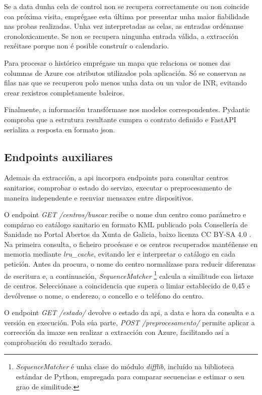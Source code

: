 Se a data dunha cela de control non se recupera correctamente ou non coincide coa próxima visita, emprégase esta última por presentar unha maior fiabilidade nas probas realizadas. Unha vez interpretadas as celas, as entradas ordénanse cronoloxicamente. Se non se recupera ningunha entrada válida, a extracción rexéitase porque non é posible construír o calendario.

Para procesar o histórico emprégase un mapa que relaciona os nomes das columnas de Azure cos atributos utilizados pola aplicación. Só se conservan as filas nas que se recuperou polo menos unha data ou un valor de INR, evitando crear rexistros completamente baleiros.

Finalmente, a información transfórmase nos modelos correspondentes. Pydantic comproba que a estrutura resultante cumpra o contrato definido e FastAPI serializa a resposta en formato \gls{json}.

\subsection{Endpoints auxiliares}

Ademais da extracción, a \gls{api} incorpora endpoints para consultar centros sanitarios, comprobar o estado do servizo, executar o preprocesamento de maneira independente e reenviar mensaxes entre dispositivos.

O endpoint \textit{GET /centros/buscar} recibe o nome dun centro como parámetro e compárao co catálogo sanitario en formato KML publicado pola Consellería de Sanidade no Portal Abertos da Xunta de Galicia, baixo licenza CC BY-SA 4.0 \cite{XuntaMapaServizosSanitarios}. Na primeira consulta, o ficheiro procésase e os centros recuperados mantéñense en memoria mediante \textit{lru\_cache}, evitando ler e interpretar o catálogo en cada petición. Antes da procura, o nome do centro normalízase para reducir diferenzas de escritura e, a continuación, \textit{SequenceMatcher} \footnote{\textit{SequenceMatcher} é unha clase do módulo \textit{difflib}, incluído na biblioteca estándar de Python, empregada para comparar secuencias e estimar o seu grao de similitude.} calcula a similitude coa listaxe de centros. Selecciónase a coincidencia que supera o limiar establecido de 0,45 e devólvense o nome, o enderezo, o concello e o teléfono do centro.

O endpoint \textit{GET /estado/} devolve o estado da \gls{api}, a data e hora da consulta e a versión en execución. Pola súa parte, \textit{POST /preprocesamento/} permite aplicar a corrección da imaxe sen realizar a extracción con Azure, facilitando así a comprobación do resultado xerado. 

